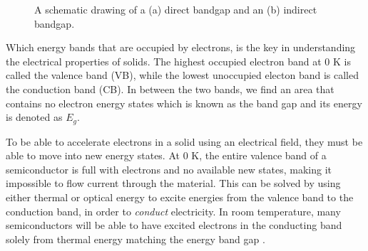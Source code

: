 \begin{figure}
  \begin{minipage}{\linewidth}
    \centering\captionsetup[subfigure]{justification=centering}
  \subcaption{}
  \label{fig:directbandgap}
  \label{fig:indirectbandgap}
  \subcaption{}
  \end{minipage}
  \caption{A schematic drawing of a (a) direct bandgap and an (b) indirect bandgap.}
\end{figure}

Which energy bands that are occupied by electrons, is the key in understanding the electrical properties of solids. The highest occupied electron band at $0$ K is called the valence band (VB), while the lowest unoccupied electon band is called the conduction band (CB). In between the two bands, we find an area that contains no electron energy states which is known as the band gap and its energy is denoted as $E_g$.

To be able to accelerate electrons in a solid using an electrical field, they must be able to move into new energy states. At $0$ K, the entire valence band of a semiconductor is full with electrons and no available new states, making it impossible to flow current through the material. This can be solved by using either thermal or optical energy to excite energies from the valence band to the conduction band, in order to \textit{conduct} electricity. In room temperature, many semiconductors will be able to have excited electrons in the conducting band solely from thermal energy matching the energy band gap \cite{BenStreetman2015}.

